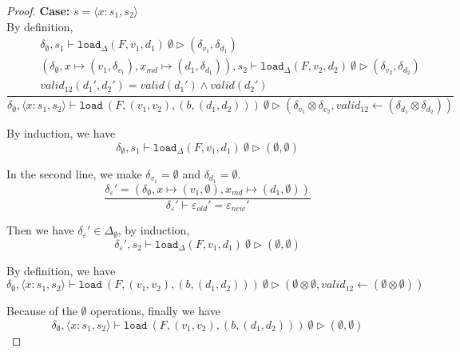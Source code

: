 \documentclass[10pt,twoside,a4paper]{article}
\theoremstyle{theorem}
\theoremstyle{lemma}
\theoremstyle{property}
\theoremstyle{definition}
\theoremstyle{assumption}
\begin{document}
\begin{proof}
	\textbf{Case: } $s = \langle x : s_1, s_2 \rangle$\\

	By definition,
	\begin{displaymath}
	\frac{\begin{array}{c}
		\delta_{\emptyset}, s_1 \vdash \mathtt{load}_\Delta (F,v_1,d_1)~ \emptyset \rhd (\delta_{v_1},\delta_{d_1})\\
		(\delta_{\emptyset}, x \mapsto (v_1, \delta_{v_1}), x_{md} \mapsto (d_1, \delta_{d_1})), s_2 \vdash \mathtt{load}_\Delta (F,v_2,d_2)~ \emptyset \rhd (\delta_{v_2},\delta_{d_2})\\
		valid_{12}({d_1}',{d_2}') = valid({d_1}') \wedge valid({d_2}')
	\end{array}}
	{\delta_{\emptyset}, \langle x:s_1,s_2 \rangle \vdash \mathtt{load}~ (F,(v_1,v_2),(b,(d_1,d_2)))~ \emptyset \rhd (\delta_{v_1} \otimes \delta_{v_2},valid_{12} \leftarrow (\delta_{d_1} \otimes \delta_{d_2})) }
	\end{displaymath}

	By induction, we have
	\begin{displaymath}
		\delta_{\emptyset}, s_1 \vdash \mathtt{load}_\Delta (F,v_1,d_1)~ \emptyset \rhd (\emptyset,\emptyset)
	\end{displaymath}

	In the second line, we make $\delta_{v_1} = \emptyset $ and $ \delta_{d_1} = \emptyset$.
	\begin{displaymath}
	\frac{
		\delta_\varepsilon' = (\delta_{\emptyset}, x \mapsto (v_1, \emptyset), x_{md} \mapsto (d_1, \emptyset))
	}
	{	\delta_\varepsilon' \vdash \varepsilon_{old}' = \varepsilon_{new}' }
	\end{displaymath}

	Then we have $\delta_\varepsilon' \in \Delta_{\emptyset}$, by induction, 
	\begin{displaymath}
		\delta_\varepsilon', s_2 \vdash \mathtt{load}_\Delta (F,v_1,d_1)~ \emptyset \rhd (\emptyset,\emptyset)
	\end{displaymath}

	By definition, we have
	\begin{displaymath}
		\delta_{\emptyset}, \langle x:s_1,s_2 \rangle \vdash \mathtt{load}~ (F,(v_1,v_2),(b,(d_1,d_2)))~ \emptyset \rhd (\emptyset \otimes \emptyset,valid_{12} \leftarrow (\emptyset \otimes \emptyset)) 
	\end{displaymath}

	Because of the $\emptyset$ operations, finally we have
	\begin{displaymath}
		\delta_{\emptyset}, \langle x:s_1,s_2 \rangle \vdash \mathtt{load}~ (F,(v_1,v_2),(b,(d_1,d_2)))~ \emptyset \rhd (\emptyset, \emptyset) 
	\end{displaymath}


\end{proof}
\end{document}
